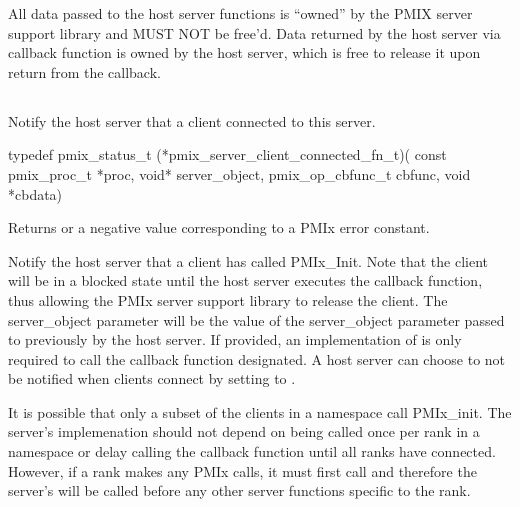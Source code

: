 All data passed to the host server functions is ``owned'' by the PMIX server support library and MUST NOT be free'd.
Data returned by the host server via callback function is owned by the host server, which is free to release it upon return from the callback.



\subsection{}

\summary

Notify the host server that a client connected to this server.

\format

\cspecificstart
\begin{codepar}
typedef pmix_status_t (*pmix_server_client_connected_fn_t)(
                             const pmix_proc_t *proc, void* server_object,
                             pmix_op_cbfunc_t cbfunc, void *cbdata)
\end{codepar}
\cspecificend

\begin{arglist}
\end{arglist}

Returns  or a negative value corresponding to a PMIx error constant.

\descr

Notify the host server that a client has called PMIx_Init.
Note that the client will be in a blocked state until the host server executes the callback function, thus allowing the PMIx server support library to release
the client.
The server_object parameter will be the value of the server_object parameter passed to
 previously by the host server.  If provided, an implementation of 
is only required to
call the callback function designated.  A host server can choose to not be notified when clients connect by setting  to .

It is possible that only a subset of the clients in a namespace call PMIx_init.   The server's  implemenation
should not depend on being called once per rank in a namespace or delay calling the callback function until all ranks have connected.
However, if a rank makes any PMIx calls, it must first call  and
therefore the server's  will be called before any other server functions specific to the rank.

